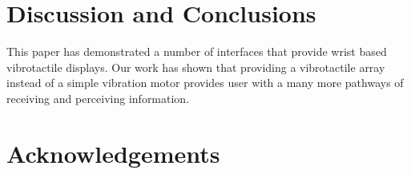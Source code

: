 \documentclass{chi-ext}
\begin{document}

\section{Discussion and Conclusions}
This paper has demonstrated a number of interfaces that provide wrist based vibrotactile displays. Our work has shown that providing a vibrotactile array instead of a simple vibration motor provides user with a many more pathways of receiving and perceiving information.


\section{Acknowledgements}
\end{document}
